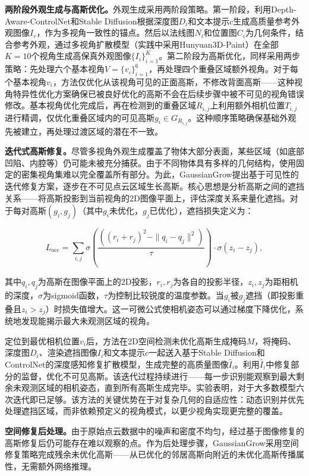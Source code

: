 \textbf{两阶段外观生成与高斯优化。}外观生成采用两阶段策略。第一阶段，利用Depth-Aware-ControlNet和Stable Diffusion根据深度图$D_i$和文本提示$c$生成高质量参考外观图像$I_r$，作为多视角一致性的锚点。然后以法线图$N_i$和位置图$C_i$为几何条件，结合参考外观，通过多视角扩散模型（实践中采用Hunyuan3D-Paint）在全部$K=10$个视角生成高保真外观图像$\{I_i\}_{i=1}^K$。第二阶段为高斯优化，同样采用两步策略：先处理六个基本视角$V = \{v_i\}_{i=1}^6$，再处理四个重叠区域额外视角。对于每个基本视角$v_i$，方法仅优化从该视角可见的正面高斯，不修改背面高斯——这种视角特异性优化方案确保已被良好优化的高斯不会在后续步骤中被不可见的视角错误修改。基本视角优化完成后，再在检测到的重叠区域$R_{i,j}$上利用额外相机位置$T_{i,j}$进行精调，仅优化重叠区域内的可见高斯$g_i \in G_{R_{i,j}}$。这种顺序策略确保基础外观先被建立，再处理过渡区域的潜在不一致。

\textbf{迭代式高斯修复。}尽管多视角外观生成覆盖了物体大部分表面，某些区域（如底部凹陷、内腔等）仍可能未被充分捕获。由于不同物体具有多样的几何结构，使用固定的密集视角集难以完全覆盖所有部分。为此，GaussianGrow提出基于可见性的迭代修复方案，逐步在不可见点云区域生长高斯。核心思想是分析高斯之间的遮挡关系——将高斯投影到当前视角的2D图像平面上，评估深度关系来量化遮挡。对于每对高斯$(g_i, g_j)$（其中$g_i$未优化，$g_j$已优化），遮挡损失定义为：

\begin{equation}
L_{\text{occ}} = \sum_{i,j} \sigma\!\left(\frac{((r_i + r_j)^2 - \|q_i - q_j\|^2)}{\tau}\right) \cdot \sigma(z_i - z_j),
\end{equation}

其中$q_i, q_j$为高斯在图像平面上的2D投影，$r_i, r_j$为各自的投影半径，$z_i, z_j$为距相机的深度，$\sigma$为sigmoid函数，$\tau$为控制比较锐度的温度参数。当$g_i$被$g_j$遮挡（即投影重叠且$z_i > z_j$）时损失值增大。这一可微公式使相机姿态可以通过梯度下降优化，系统地发现能揭示最大未观测区域的视角。

定位到最优相机位置$v_i$后，方法在2D空间检测未优化高斯生成掩码$M$，将掩码、深度图$D_i$、渲染遮挡图像$I_i$和文本提示$c$一起送入基于Stable Diffusion和ControlNet的深度感知修复扩散模型，生成完整的高质量图像$\hat{I}_i$。利用$\hat{I}_i$中修复部分的监督，优化不可见高斯。该迭代过程持续进行——每一步识别能观察到最大剩余未观测区域的相机姿态，直到所有高斯生成完毕。实验表明，对于大多数模型六次迭代即已足够。该方法的关键优势在于对复杂几何的自适应性：动态识别并优先处理遮挡区域，而非依赖预定义的视角模式，以更少视角实现更完整的覆盖。

\textbf{空间修复后处理。}由于原始点云数据中的噪声和密度不均匀，经过基于图像修复的高斯修复后仍可能存在难以观察的点。作为后处理步骤，GaussianGrow采用空间修复策略完成残余未优化高斯——从已优化的邻居高斯向附近的未优化高斯传播属性，无需额外网络推理。

